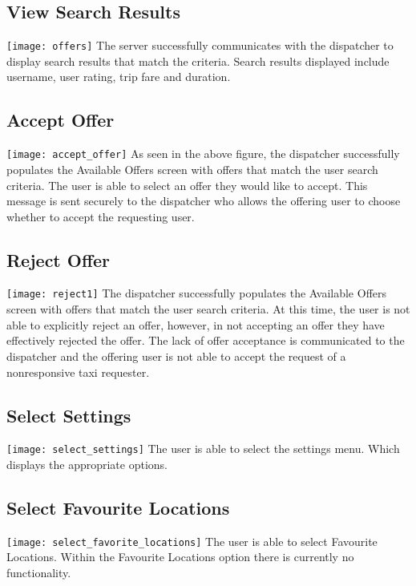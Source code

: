 \documentclass[english]{article}
\begin{document}
\subsection{View Search Results}
\texttt{[image: offers]}
\newline
The server successfully communicates with the dispatcher to display search results that match the criteria. Search results displayed include username, user rating, trip fare and duration. 

\subsection{Accept Offer}
\texttt{[image: accept\_offer]}
\newline
As seen in the above figure, the dispatcher successfully populates the Available Offers screen with offers that match the user search criteria. The user is able to select an offer they would like to accept. This message is sent securely to the dispatcher who allows the offering user to choose whether to accept the requesting user. 

\subsection{Reject Offer}
\texttt{[image: reject1]}
The dispatcher successfully populates the Available Offers screen with offers that match the user search criteria. At this time, the user is not able to explicitly reject an offer, however, in not accepting an offer they have effectively rejected the offer. The lack of offer acceptance is communicated to the dispatcher and the offering user is not able to accept the request of a nonresponsive taxi requester. 

\subsection{Select Settings}
\texttt{[image: select\_settings]}
\newline
The user is able to select the settings menu. Which displays the appropriate options. 

\subsection{Select Favourite Locations}
\texttt{[image: select\_favorite\_locations]}
The user is able to select Favourite Locations. Within the Favourite Locations option there is currently no functionality. 
\end{document}
